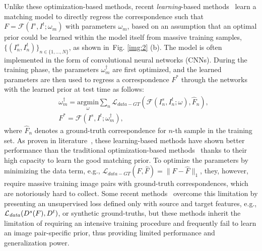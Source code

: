 \documentclass[10pt,twocolumn,letterpaper]{article}
\newcommand{\figref}[1]{Fig. \ref{#1}}
\begin{document}
Unlike these optimization-based methods, recent \emph{learning}-based methods~\cite{rocco2017convolutional,Sun_2018_CVPR,shen2019self,melekhov2019dgc,teed2020raft,truong2020glu} learn a matching model to directly regress the correspondence such that $F={\mathcal{F}}(I^s,I^t;\omega_m)$ with parameters $\omega_m$, based on an assumption that an optimal prior could be learned within the model itself from massive training samples, $\{(I^s_n,I^t_n)\}_{n\in\{1,...,N\}}$, as shown in~\figref{img:2} (b). The model is often implemented in the form of convolutional neural networks (CNNs). During the training phase, the parameters $\omega^\dagger_m$ are first optimized, and the learned parameters are then used to regress a correspondence $F^{*}$ through the networks with the learned prior at test time as follows:   
\begin{equation}
\begin{split}
&\omega^\dagger_m =\underset{\omega}{\mathrm{argmin}}
\sum_{n}\mathcal{L}_{data-GT}({\mathcal{F}}(I^s_{n},I^t_{n};\omega),\hat{F}_{n}), \\
&F^{*}=\mathcal{F}(I^s,I^t;\omega^\dagger_m),
\end{split}
\end{equation}
where $\hat{F}_{n}$ denotes a ground-truth correspondence for $n$-th sample in the training set. As proven in literature~\cite{melekhov2019dgc,truong2020glu}, these learning-based methods have shown better performance than the traditional optimization-based methods~\cite{liu2010sift,ham2016proposal,kim2017dctm} thanks to their high capacity to learn the good matching prior. To optimize the parameters by minimizing the data term, e.g., $\mathcal{L}_{data-GT}(F,\hat{F})=\|F-\hat{F}\|_1$, they, however, require massive training image pairs with ground-truth correspondences, which are notoriously hard to collect. Some recent methods~\cite{rocco2017convolutional,shen2020ransac} overcome this limitation by presenting an unsupervised loss defined only with source and target features, e.g., $\mathcal{L}_{\it{data}}(D^{s}(F),D^{t})$, or synthetic ground-truths, but these methods inherit the limitation of requiring an intensive training procedure and frequently fail to learn an image pair-specific prior, thus providing limited performance and generalization power.
\end{document}
